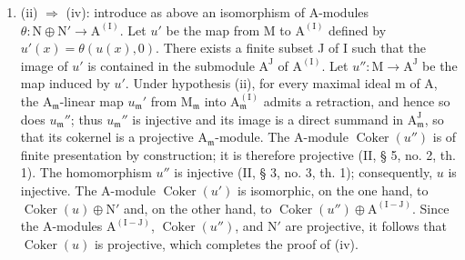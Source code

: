 \begin{enumerate}
\def\labelenumi{(\roman{enumi})}
\setcounter{enumi}{1}
\tightlist
\item
  (ii) \(\Rightarrow\) (iv): introduce as above an isomorphism of A-modules \(\theta: \mathrm{N} \oplus \mathrm{N}' \to \mathrm{A}^{(\mathrm{I})}\). Let \(u'\) be the map from M to \(\mathrm{A}^{(\mathrm{I})}\) defined by \(u'(x) = \theta(u(x), 0)\). There exists a finite subset J of I such that the image of \(u'\) is contained in the submodule \(\mathrm{A}^{\mathrm{J}}\) of \(\mathrm{A}^{(\mathrm{I})}\). Let \(u'': \mathrm{M} \to \mathrm{A}^{\mathrm{J}}\) be the map induced by \(u'\). Under hypothesis (ii), for every maximal ideal m of A, the \(\mathrm{A}_{\mathfrak{m}}\)-linear map \(u_{\mathfrak{m}}'\) from \(\mathrm{M}_{\mathfrak{m}}\) into \(\mathrm{A}_{\mathfrak{m}}^{(\mathrm{I})}\) admits a retraction, and hence so does \(u_{\mathfrak{m}}''\); thus \(u_{\mathfrak{m}}''\) is injective and its image is a direct summand in \(\mathrm{A}_{\mathfrak{m}}^{\mathrm{J}}\), so that its cokernel is a projective \(\mathrm{A}_{\mathfrak{m}}\)-module. The A-module \(\operatorname{Coker}(u'')\) is of finite presentation by construction; it is therefore projective (II, § 5, no. 2, th. 1). The homomorphism \(u''\) is injective (II, § 3, no. 3, th. 1); consequently, \(u\) is injective. The A-module \(\operatorname{Coker}(u')\) is isomorphic, on the one hand, to \(\operatorname{Coker}(u) \oplus \mathrm{N}'\) and, on the other hand, to \(\operatorname{Coker}(u'') \oplus \mathrm{A}^{(\mathrm{I}-\mathrm{J})}\). Since the A-modules \(\mathrm{A}^{(\mathrm{I}-\mathrm{J})}\), \(\operatorname{Coker}(u'')\), and \(\mathrm{N}'\) are projective, it follows that \(\operatorname{Coker}(u)\) is projective, which completes the proof of (iv).
\end{enumerate}

